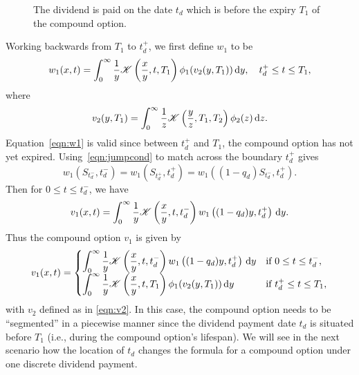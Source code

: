 \begin{figure}[!h]
\centering
{}
\caption{The dividend is paid on the date $t_d$ which is before the expiry $T_1$ of the compound option.}
\label{fig:2}
\end{figure}
\noindent
Working backwards from $T_1$ to $t_d^+$, we first define $w_1$ to be
		\begin{equation}
			\label{eqn:w1}
			w_1(x,t) = \int_0^\infty \frac{1}{y} \mathscr K\left( \frac{x}{y}, t, T_1 \right) \phi_1(v_2(y,T_1)) \, \mathrm d y, \quad t_d^+ \leq t \leq T_1,
		\end{equation}
where
		\begin{equation}
			\label{eqn:v2}
			v_2(y,T_1) = \int_0^\infty \frac{1}{z} \mathscr K\left( \frac{y}{z}, T_1, T_2 \right) \phi_2(z) \, \mathrm d z.
		\end{equation}
Equation~\eqref{eqn:w1} is valid since between $t_d^+$ and $T_1$, the compound option has not yet expired. Using~\eqref{eqn:jumpcond} to match across the boundary $t_d^+$ gives
		$$
			w_1\left(S_{t_d^-},t_d^-\right) = w_1\left(S_{t_d^+},t_d^+\right) = w_1\left((1-q_d)S_{t_d^-},t_d^+\right).
		$$
	Then for $0 \leq t \leq t_d^-$, we have
		$$
			v_1(x,t) = \int_0^\infty \frac{1}{y}\mathscr K\left( \frac{x}{y}, t, t_d^- \right)w_1\left((1-q_d)y, t_d^+\right) \, \mathrm d y.
		$$
	Thus the compound option $v_1$ is given by
		\begin{equation}
			\label{eqn:v1}
			v_1(x,t) =
			\begin{cases}
				\displaystyle\int_0^\infty \frac{1}{y} \mathscr K\left( \frac{x}{y}, t, t_d^- \right)w_1\left( (1-q_d)y, t_d^+ \right) \, \mathrm d y & \text{if } 0 \leq t \leq t_d^-, \\
				\displaystyle\int_0^\infty \frac{1}{y} \mathscr K\left( \frac{x}{y}, t, T_1 \right) \phi_1(v_2(y,T_1)) \, \mathrm d y & \text{if } t_d^+ \leq t \leq T_1,
			\end{cases}
		\end{equation}
	with $v_2$ defined as in \eqref{eqn:v2}.
In this case, the compound option needs to be ``segmented'' in a piecewise manner since the dividend payment date $t_d$ is situated before $T_1$ (i.e., during the compound option's lifespan). We will see in the next scenario how the location of $t_d$ changes the formula for a compound option under one discrete dividend payment.
	
